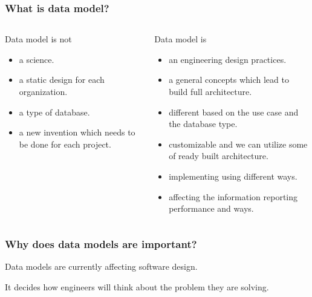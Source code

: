 \begin{frame}
\frametitle{What is data model?}

\begin{columns}[T] %
	\begin{column}{.45\textwidth}
		Data model is not	
		\begin{itemize}
			\item a science.
			\item a static design for each organization.
			\item a type of database.
			\item a new invention which needs to be done for each project.
		\end{itemize}
		
		\end{column}%
		\hfill%
		\begin{column}{.45\textwidth}
		Data model is		
			\begin{itemize}
				\item an engineering design practices.
				\item a general concepts which lead to build full architecture.
				\item different based on the use case and the database type.
				\item customizable and we can utilize some of ready built architecture. 
				\item implementing using different ways.
				\item affecting the information reporting performance and ways.
			\end{itemize}
		
		\end{column}%
	\end{columns}

\end{frame}

\begin{frame}
\frametitle{Why does data models are important?}
	\begin{wideitemize}	
		\item Data models are currently affecting software design. 
		\item It decides how engineers will think about the problem they are solving.
	\end{wideitemize}
\end{frame}
